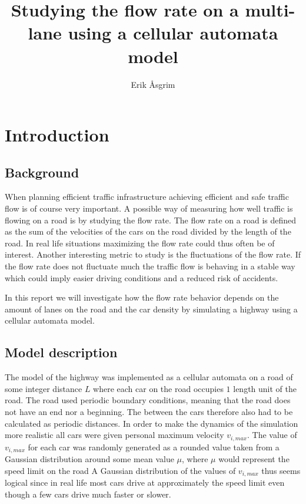 \documentclass[a4paper,12pt]{article}
\title{Studying the flow rate on a multi-lane using a cellular automata model}
\author{Erik Åsgrim}
\begin{document}
\maketitle

\section*{Introduction}
\subsection*{Background}
When planning efficient traffic infrastructure achieving efficient and safe traffic flow is of course very important.
A possible way of measuring how well traffic is flowing on a road is by studying the flow rate.
The flow rate on a road is defined as the sum of the velocities of the cars on the road divided by the length of the road.
In real life situations maximizing the flow rate could thus often be of interest. Another interesting metric to study is the fluctuations of the 
flow rate. If the flow rate does not fluctuate much the traffic flow is behaving in a stable way which could imply easier
driving conditions and a reduced risk of accidents.

In this report we will investigate how the flow rate behavior depends on the amount of lanes on the road and the car density by simulating
a highway using a cellular automata model.

\subsection*{Model description}
The model of the highway was implemented as a cellular automata on a road of some integer distance $L$ where each car on the road occupies $1$ length unit of the road. 
The road used periodic boundary conditions, meaning that the road does not have an end nor a beginning. The between the cars therefore also had to be calculated as periodic distances.
In order to make the dynamics of the simulation more realistic all cars were given personal maximum velocity $v_{i,max}$. The value of $v_{i, max}$ for each car was randomly generated 
as a rounded value taken from a Gaussian distribution around some mean value $\mu$, where $\mu$ would represent the speed limit on the road A Gaussian distribution of the values of $v_{i, max}$ thus
seems logical since in real life most cars drive at approximately the speed limit even though a few cars drive much faster or slower.
\end{document}
